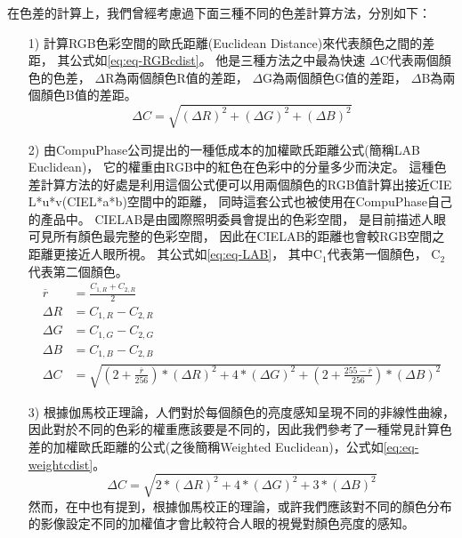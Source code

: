 \documentclass[class=NCU_thesis, crop=false]{standalone}
\begin{document}
			在色差的計算上，我們曾經考慮過下面三種不同的色差計算方法，分別如下：
			\begin{itemize}
			  \item [1)] 
			  	計算RGB色彩空間的歐氏距離(Euclidean Distance)來代表顏色之間的差距，
			  	其公式如\cref{eq:eq-RGBcdist}。
			  	他是三種方法之中最為快速
			  	$\Delta$C代表兩個顏色的色差，
			  	$\Delta$R為兩個顏色R值的差距，
			  	$\Delta$G為兩個顏色G值的差距，
			  	$\Delta$B為兩個顏色B值的差距。
			  	\begin{equation}
			    \label{eq:eq-RGBcdist}
			    	\Delta C = \sqrt{(\Delta R)^2 + (\Delta G)^2 + (\Delta B)^2}
				\end{equation}

			  \item [2)]
			  	由CompuPhase公司提出的一種低成本的加權歐氏距離公式\cite{LABformula}(簡稱LAB Euclidean)，
			  	它的權重由RGB中的紅色在色彩中的分量多少而決定。
			  	這種色差計算方法的好處是利用這個公式便可以用兩個顏色的RGB值計算出接近CIE L*u*v(CIEL*a*b)空間中的距離，
			  	同時這套公式也被使用在CompuPhase自己的產品中。
			  	CIELAB是由國際照明委員會提出的色彩空間，
			  	是目前描述人眼可見所有顏色最完整的色彩空間，
			  	因此在CIELAB的距離也會較RGB空間之距離更接近人眼所視。
			  	其公式如\cref{eq:eq-LAB}，
			  	其中C$_{1}$代表第一個顏色，
			  	C$_{2}$代表第二個顏色。
			  	\begin{equation}
			    \label{eq:eq-LAB}
			    \begin{split}
			    	\overline{r} & = \frac{C_{1,R} + C_{2,R}}{2} \\
			    	\Delta R & = C_{1,R} - C_{2,R} \\
			    	\Delta G & = C_{1,G} - C_{2,G} \\
			    	\Delta B & = C_{1,B} - C_{2,B} \\
			    	\Delta C & = \sqrt{(2 + \frac{\overline{r}}{256}) * (\Delta R)^2 + 4 * (\Delta G)^2 + (2 + \frac{255 - \overline{r}}{256}) * (\Delta B)^2}
			    \end{split}
				\end{equation}

			  \item [3)]
			  	根據伽馬校正理論，人們對於每個顏色的亮度感知呈現不同的非線性曲線，因此對於不同的色彩的權重應該要是不同的，因此我們參考了一種常見計算色差的加權歐氏距離的公式(之後簡稱Weighted Euclidean)，公式如\cref{eq:eq-weightcdist}。
			  	\begin{equation}
			    \label{eq:eq-weightcdist}
			    	\Delta C = \sqrt{2 * (\Delta R)^2 + 4 * (\Delta G)^2 + 3 * (\Delta B)^2}
				\end{equation}
				然而，在\cite{LABformula}中也有提到，根據伽馬校正的理論，或許我們應該對不同的顏色分布的影像設定不同的加權值才會比較符合人眼的視覺對顏色亮度的感知。
			\end{itemize}
\end{document}
